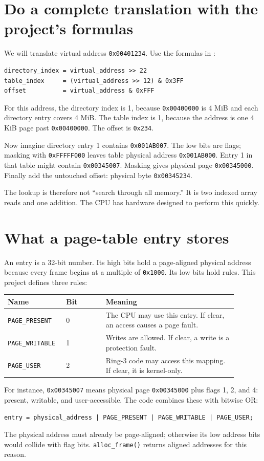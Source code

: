 \section{Do a complete translation with the project's formulas}
We will translate virtual address \texttt{0x00401234}. Use the formulas in :
\begin{verbatim}
directory_index = virtual_address >> 22
table_index     = (virtual_address >> 12) & 0x3FF
offset          = virtual_address & 0xFFF
\end{verbatim}
For this address, the directory index is 1, because \texttt{0x00400000} is 4 MiB and each directory entry covers 4 MiB. The table index is 1, because the address is one 4 KiB page past \texttt{0x00400000}. The offset is \texttt{0x234}.

Now imagine directory entry 1 contains \texttt{0x001AB007}. The low bits are flags; masking with \texttt{0xFFFFF000} leaves table physical address \texttt{0x001AB000}. Entry 1 in that table might contain \texttt{0x00345007}. Masking gives physical page \texttt{0x00345000}. Finally add the untouched offset: physical byte \texttt{0x00345234}.

The lookup is therefore not ``search through all memory.'' It is two indexed array reads and one addition. The CPU has hardware designed to perform this quickly.

\section{What a page-table entry stores}
An entry is a 32-bit number. Its high bits hold a page-aligned physical address because every frame begins at a multiple of \texttt{0x1000}. Its low bits hold rules. This project defines three rules:
\begin{longtable}{p{0.20\linewidth}p{0.16\linewidth}p{0.53\linewidth}}
\textbf{Name} & \textbf{Bit} & \textbf{Meaning}\\ \hline
\texttt{PAGE\_PRESENT} & 0 & The CPU may use this entry. If clear, an access causes a page fault.\\
\texttt{PAGE\_WRITABLE} & 1 & Writes are allowed. If clear, a write is a protection fault.\\
\texttt{PAGE\_USER} & 2 & Ring-3 code may access this mapping. If clear, it is kernel-only.\\
\end{longtable}

For instance, \texttt{0x00345007} means physical page \texttt{0x00345000} plus flags 1, 2, and 4: present, writable, and user-accessible. The code combines these with bitwise OR:
\begin{verbatim}
entry = physical_address | PAGE_PRESENT | PAGE_WRITABLE | PAGE_USER;
\end{verbatim}
The physical address must already be page-aligned; otherwise its low address bits would collide with flag bits. \texttt{alloc\_frame()} returns aligned addresses for this reason.

